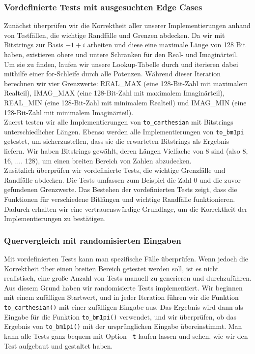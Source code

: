 \documentclass[course=erap]{aspdoc}
\begin{document}
\subsubsection{Vordefinierte Tests mit ausgesuchten Edge Cases}
Zunächst überprüfen wir die Korrektheit aller unserer Implementierungen anhand von Testfällen, die wichtige Randfälle und Grenzen abdecken. Da wir mit Bitstrings zur Basis $-1 + i$ arbeiten und diese eine maximale Länge von 128 Bit haben, existieren obere und untere Schranken für den Real- und Imaginärteil.\\
Um sie zu finden, laufen wir unsere Lookup-Tabelle durch und iterieren dabei mithilfe einer for-Schleife durch alle Potenzen. Während dieser Iteration berechnen wir vier Grenzwerte: REAL\_MAX (eine 128-Bit-Zahl mit maximalem Realteil), IMAG\_MAX (eine 128-Bit-Zahl mit maximalem Imaginärteil), REAL\_MIN (eine 128-Bit-Zahl mit minimalem Realteil) und IMAG\_MIN (eine 128-Bit-Zahl mit minimalem Imaginärteil).\\ 
Zuerst testen wir alle Implementierungen von \texttt{to\_carthesian} mit Bitstrings unterschiedlicher Längen. Ebenso werden alle Implementierungen von \texttt{to\_bm1pi} getestet, um sicherzustellen, dass sie die erwarteten Bitstrings als Ergebnis liefern. Wir haben Bitstrings gewählt, deren Längen Vielfache von 8 sind (also 8, 16, .... 128), um einen breiten Bereich von Zahlen abzudecken.\\
Zusätzlich überprüfen wir vordefinierte Tests, die wichtige Grenzfälle und Randfälle abdecken. Die Tests umfassen zum Beispiel die Zahl 0 und die zuvor gefundenen Grenzwerte. Das Bestehen der vordefinierten Tests zeigt, dass die Funktionen für verschiedene Bitlängen und wichtige Randfälle funktionieren. Dadurch erhalten wir eine vertrauenswürdige Grundlage, um die Korrektheit der Implementierungen zu bestätigen.

\subsubsection{Quervergleich mit randomisierten Eingaben}
Mit vordefinierten Tests kann man spezifische Fälle überprüfen. Wenn jedoch die Korrektheit über einen breiten Bereich getestet werden soll, ist es nicht realistisch, eine große Anzahl von Tests manuell zu generieren und durchzuführen. Aus diesem Grund haben wir randomisierte Tests implementiert. Wir beginnen mit einem zufälligen Startwert, und in jeder Iteration führen wir die Funktion \texttt{to\_carthesian()} mit einer zufälligen Eingabe aus. Das Ergebnis wird dann als Eingabe für die Funktion \texttt{to\_bm1pi()} verwendet, und wir überprüfen, ob das Ergebnis von \texttt{to\_bm1pi()} mit der ursprünglichen Eingabe übereinstimmt. Man kann alle Tests ganz bequem mit Option \texttt{-t} laufen lassen und sehen, wie wir den Test aufgebaut und gestaltet haben.
\end{document}
